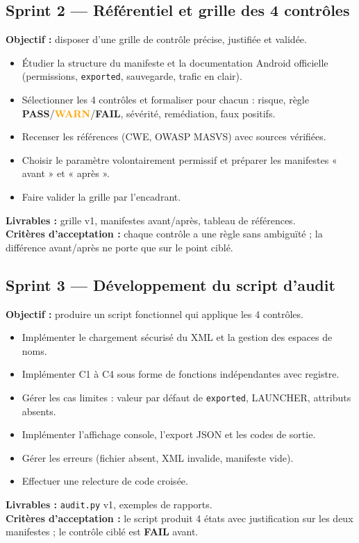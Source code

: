 \documentclass[11pt,a4paper]{article}
\newcommand{\code}[1]{{\NoAutoSpacing\texttt{\small #1}}}
\newcommand{\code}[1]{{\texttt{\small #1}}}
\newcommand{\PASS}{\textbf{\textcolor{vert}{PASS}}}
\newcommand{\FAIL}{\textbf{\textcolor{rouge}{FAIL}}}
\newcommand{\WARN}{\textbf{\textcolor{orange}{WARN}}}
\begin{document}
\subsection{Sprint 2 --- Référentiel et grille des 4 contrôles}
\textbf{Objectif :} disposer d'une grille de contrôle précise, justifiée et validée.
\begin{itemize}
  \item Étudier la structure du manifeste et la documentation Android officielle (permissions, \code{exported}, sauvegarde, trafic en clair).
  \item Sélectionner les 4 contrôles et formaliser pour chacun : risque, règle \PASS{}/\WARN{}/\FAIL{}, sévérité, remédiation, faux positifs.
  \item Recenser les références (CWE, OWASP MASVS) avec sources vérifiées.
  \item Choisir le paramètre volontairement permissif et préparer les manifestes « avant » et « après ».
  \item Faire valider la grille par l'encadrant.
\end{itemize}
\textbf{Livrables :} grille v1, manifestes avant/après, tableau de références.\\
\textbf{Critères d'acceptation :} chaque contrôle a une règle sans ambiguïté ; la différence avant/après ne porte que sur le point ciblé.

\subsection{Sprint 3 --- Développement du script d'audit}
\textbf{Objectif :} produire un script fonctionnel qui applique les 4 contrôles.
\begin{itemize}
  \item Implémenter le chargement sécurisé du XML et la gestion des espaces de noms.
  \item Implémenter C1 à C4 sous forme de fonctions indépendantes avec registre.
  \item Gérer les cas limites : valeur par défaut de \code{exported}, LAUNCHER, attributs absents.
  \item Implémenter l'affichage console, l'export JSON et les codes de sortie.
  \item Gérer les erreurs (fichier absent, XML invalide, manifeste vide).
  \item Effectuer une relecture de code croisée.
\end{itemize}
\textbf{Livrables :} \code{audit.py} v1, exemples de rapports.\\
\textbf{Critères d'acceptation :} le script produit 4 états avec justification sur les deux manifestes ; le contrôle ciblé est \FAIL{} avant.
\end{document}
